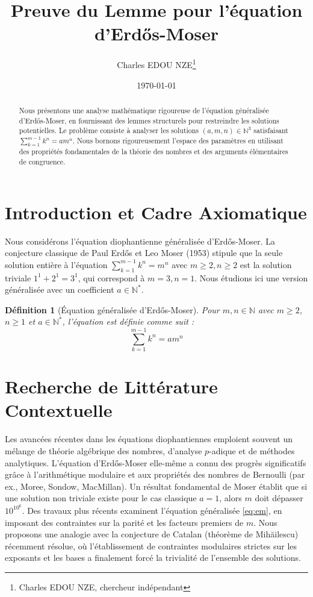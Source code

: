 \documentclass[11pt,a4paper]{article}
\title{Preuve du Lemme pour l'équation d'Erdős-Moser}
\author{Charles EDOU NZE\thanks{Charles EDOU NZE, chercheur indépendant}}
\date{\today}
\newtheorem{definition}{Définition}
\begin{document}
\maketitle

\begin{abstract}
Nous présentons une analyse mathématique rigoureuse de l'équation généralisée d'Erdős-Moser, en fournissant des lemmes structurels pour restreindre les solutions potentielles. Le problème consiste à analyser les solutions $(a, m, n) \in \mathbb{N}^3$ satisfaisant $\sum_{k=1}^{m-1} k^n = a m^n$. Nous bornons rigoureusement l'espace des paramètres en utilisant des propriétés fondamentales de la théorie des nombres et des arguments élémentaires de congruence.
\end{abstract}

\section{Introduction et Cadre Axiomatique}

Nous considérons l'équation diophantienne généralisée d'Erdős-Moser. La conjecture classique de Paul Erdős et Leo Moser (1953) stipule que la seule solution entière à l'équation $\sum_{k=1}^{m-1} k^n = m^n$ avec $m \ge 2, n \ge 2$ est la solution triviale $1^1 + 2^1 = 3^1$, qui correspond à $m=3, n=1$. Nous étudions ici une version généralisée avec un coefficient $a \in \mathbb{N}^*$.

\begin{definition}[Équation généralisée d'Erdős-Moser]
Pour $m, n \in \mathbb{N}$ avec $m \ge 2$, $n \ge 1$ et $a \in \mathbb{N}^*$, l'équation est définie comme suit :
\begin{equation}
\sum_{k=1}^{m-1} k^n = a m^n
\label{eq:em}
\end{equation}
\end{definition}

\section{Recherche de Littérature Contextuelle}

Les avancées récentes dans les équations diophantiennes emploient souvent un mélange de théorie algébrique des nombres, d'analyse $p$-adique et de méthodes analytiques. L'équation d'Erdős-Moser elle-même a connu des progrès significatifs grâce à l'arithmétique modulaire et aux propriétés des nombres de Bernoulli (par ex., Moree, Sondow, MacMillan). Un résultat fondamental de Moser établit que si une solution non triviale existe pour le cas classique $a=1$, alors $m$ doit dépasser $10^{10^6}$. Des travaux plus récents examinent l'équation généralisée \eqref{eq:em}, en imposant des contraintes sur la parité et les facteurs premiers de $m$. Nous proposons une analogie avec la conjecture de Catalan (théorème de Mihăilescu) récemment résolue, où l'établissement de contraintes modulaires strictes sur les exposants et les bases a finalement forcé la trivialité de l'ensemble des solutions.
\end{document}
